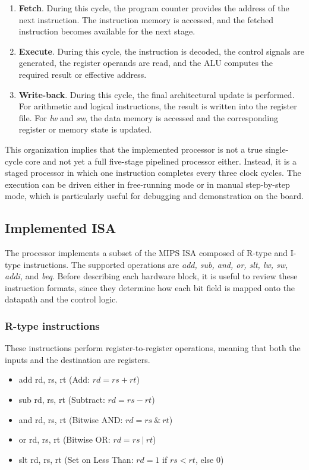 \documentclass[a4paper,11pt]{scrartcl}
\begin{document}
\begin{enumerate}
\item \textbf{Fetch}.
During this cycle, the program counter provides the address of the next instruction. The instruction memory is accessed, and the fetched instruction becomes available for the next stage.
\item \textbf{Execute}.
During this cycle, the instruction is decoded, the control signals are generated, the register operands are read, and the ALU computes the required result or effective address.
\item \textbf{Write-back}.
During this cycle, the final architectural update is performed. For arithmetic and logical instructions, the result is written into the register file. For \emph{lw} and \emph{sw}, the data memory is accessed and the corresponding register or memory state is updated.
\end{enumerate}

This organization implies that the implemented processor is not a true single-cycle core and not yet a full five-stage pipelined processor either. Instead, it is a staged processor in which one instruction completes every three clock cycles. The execution can be driven either in free-running mode or in manual step-by-step mode, which is particularly useful for debugging and demonstration on the board.
\subsection{Implemented ISA}
\label{sec:orgd6244be}

The processor implements a subset of the MIPS ISA composed of R-type and I-type instructions. The supported operations are \emph{add, sub, and, or, slt, lw, sw, addi,} and \emph{beq}. Before describing each hardware block, it is useful to review these instruction formats, since they determine how each bit field is mapped onto the datapath and the control logic.
\subsubsection{R-type instructions}
\label{sec:org6980d1e}
These instructions perform register-to-register operations, meaning that both the inputs and the destination are registers.
\begin{itemize}
\item add rd, rs, rt (Add: \(rd = rs + rt\))
\item sub rd, rs, rt (Subtract: \(rd = rs - rt\))
\item and rd, rs, rt (Bitwise AND: \(rd = rs \ \& \ rt\))
\item or  rd, rs, rt (Bitwise OR: \(rd = rs \ | \ rt\))
\item slt rd, rs, rt (Set on Less Than: \(rd = 1\) if \(rs < rt\), else \(0\))
\end{itemize}
\end{document}

